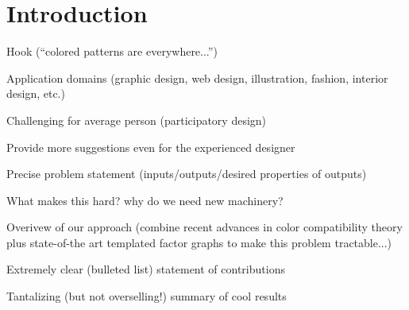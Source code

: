 \section{Introduction}
\label{sec:introduction}

Hook (``colored patterns are everywhere...'')

Application domains (graphic design, web design, illustration, fashion, interior design, etc.)

Challenging for average person (participatory design)

Provide more suggestions even for the experienced designer

Precise problem statement (inputs/outputs/desired properties of outputs)

What makes this hard? why do we need new machinery?

Overivew of our approach (combine recent advances in color compatibility theory plus state-of-the art templated factor graphs to make this problem tractable...)

Extremely clear (bulleted list) statement of contributions

Tantalizing (but not overselling!) summary of cool results